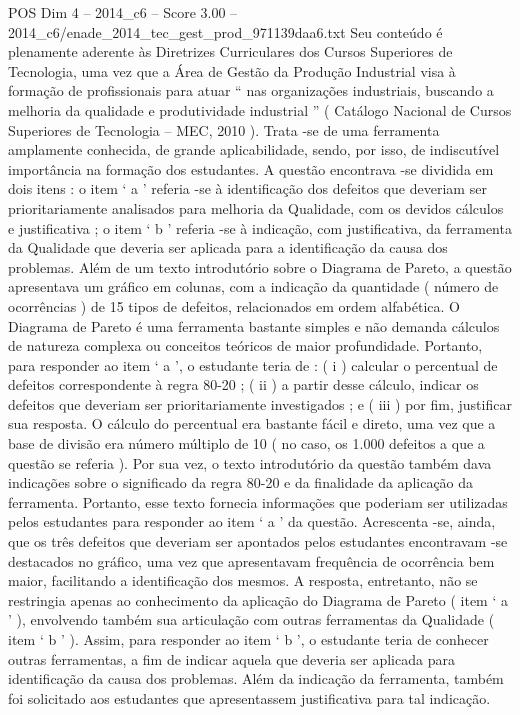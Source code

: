 \begin{textsample}{POS Dim 4 – 2014\_c6 – Score 3.00 – 2014\_c6/enade\_2014\_tec\_gest\_prod\_971139daa6.txt}
Seu conteúdo é plenamente aderente às Diretrizes Curriculares dos Cursos Superiores de Tecnologia, uma vez que a Área de Gestão da Produção Industrial visa à formação de profissionais para atuar “ nas organizações industriais, buscando a melhoria da qualidade e produtividade industrial ” ( Catálogo Nacional de Cursos Superiores de Tecnologia – MEC, 2010 ).
Trata -se de uma ferramenta amplamente conhecida, de grande aplicabilidade, sendo, por isso, de indiscutível importância na formação dos estudantes.
A questão encontrava -se dividida em dois itens : o item ‘ a ’ referia -se à identificação dos defeitos que deveriam ser prioritariamente analisados para melhoria da Qualidade, com os devidos cálculos e justificativa ; o item ‘ b ’ referia -se à indicação, com justificativa, da ferramenta da Qualidade que deveria ser aplicada para a identificação da causa dos problemas.
Além de um texto introdutório sobre o Diagrama de Pareto, a questão apresentava um gráfico em colunas, com a indicação da quantidade ( número de ocorrências ) de 15 tipos de defeitos, relacionados em ordem alfabética.
O Diagrama de Pareto é uma ferramenta bastante simples e não demanda cálculos de natureza complexa ou conceitos teóricos de maior profundidade.
Portanto, para responder ao item ‘ a ’, o estudante teria de : ( i ) calcular o percentual de defeitos correspondente à regra 80-20 ; ( ii ) a partir desse cálculo, indicar os defeitos que deveriam ser prioritariamente investigados ; e ( iii ) por fim, justificar sua resposta.
O cálculo do percentual era bastante fácil e direto, uma vez que a base de divisão era número múltiplo de 10 ( no caso, os 1.000 defeitos a que a questão se referia ).
Por sua vez, o texto introdutório da questão também dava indicações sobre o significado da regra 80-20 e da finalidade da aplicação da ferramenta.
Portanto, esse texto fornecia informações que poderiam ser utilizadas pelos estudantes para responder ao item ‘ a ’ da questão.
Acrescenta -se, ainda, que os três defeitos que deveriam ser apontados pelos estudantes encontravam -se destacados no gráfico, uma vez que apresentavam frequência de ocorrência bem maior, facilitando a identificação dos mesmos.
A resposta, entretanto, não se restringia apenas ao conhecimento da aplicação do Diagrama de Pareto ( item ‘ a ’ ), envolvendo também sua articulação com outras ferramentas da Qualidade ( item ‘ b ’ ).
Assim, para responder ao item ‘ b ’, o estudante teria de conhecer outras ferramentas, a fim de indicar aquela que deveria ser aplicada para identificação da causa dos problemas.
Além da indicação da ferramenta, também foi solicitado aos estudantes que apresentassem justificativa para tal indicação.

\end{textsample}
